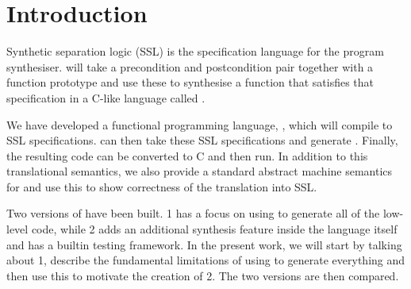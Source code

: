 \section{Introduction}

Synthetic separation logic (SSL) is the specification language for the \SuSLik{} program synthesiser. \SuSLik{} will take a precondition and postcondition pair together
with a function prototype and use these to synthesise a function that satisfies that specification in a C-like language called \SuSLang.

We have developed a  functional programming language, \Pika, which will compile to SSL specifications. \SuSLik{} can then take these SSL specifications and generate \SuSLang. Finally, the resulting \SuSLang{} code can be converted to C and then run. In addition to this translational semantics, we also provide a standard abstract machine semantics for \Pika{} and use this to show correctness of the translation into SSL.

Two versions of \Pika{} have been built. \Pika{} 1 has a focus on using \SuSLik{} to generate all of the low-level code, while \Pika{} 2 adds an additional synthesis feature inside the \Pika{} language itself and has a builtin testing framework. In the present work, we will start by talking about \Pika{} 1, describe the fundamental limitations of using \SuSLik{} to generate everything and then use this to motivate the creation of \Pika{} 2. The two versions are then compared.

